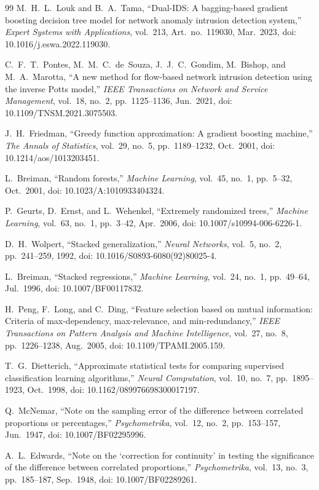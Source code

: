 \documentclass[10pt,journal,twocolumn]{IEEEtran}
\begin{document}
\begin{thebibliography}{99}
M.~H.~L.~Louk and B.~A.~Tama, ``Dual-IDS: A bagging-based gradient boosting decision tree model for network anomaly intrusion detection system,'' \emph{Expert Systems with Applications}, vol.~213, Art.~no.~119030, Mar.~2023, doi: 10.1016/j.eswa.2022.119030.

C.~F.~T.~Pontes, M.~M.~C.~de~Souza, J.~J.~C.~Gondim, M.~Bishop, and M.~A.~Marotta, ``A new method for flow-based network intrusion detection using the inverse Potts model,'' \emph{IEEE Transactions on Network and Service Management}, vol.~18, no.~2, pp.~1125--1136, Jun.~2021, doi: 10.1109/TNSM.2021.3075503.

J.~H.~Friedman, ``Greedy function approximation: A gradient boosting machine,'' \emph{The Annals of Statistics}, vol.~29, no.~5, pp.~1189--1232, Oct.~2001, doi: 10.1214/aos/1013203451.

L.~Breiman, ``Random forests,'' \emph{Machine Learning}, vol.~45, no.~1, pp.~5--32, Oct.~2001, doi: 10.1023/A:1010933404324.

P.~Geurts, D.~Ernst, and L.~Wehenkel, ``Extremely randomized trees,'' \emph{Machine Learning}, vol.~63, no.~1, pp.~3--42, Apr.~2006, doi: 10.1007/s10994-006-6226-1.

D.~H.~Wolpert, ``Stacked generalization,'' \emph{Neural Networks}, vol.~5, no.~2, pp.~241--259, 1992, doi: 10.1016/S0893-6080(92)80025-4.

L.~Breiman, ``Stacked regressions,'' \emph{Machine Learning}, vol.~24, no.~1, pp.~49--64, Jul.~1996, doi: 10.1007/BF00117832.

H.~Peng, F.~Long, and C.~Ding, ``Feature selection based on mutual information: Criteria of max-dependency, max-relevance, and min-redundancy,'' \emph{IEEE Transactions on Pattern Analysis and Machine Intelligence}, vol.~27, no.~8, pp.~1226--1238, Aug.~2005, doi: 10.1109/TPAMI.2005.159.

T.~G.~Dietterich, ``Approximate statistical tests for comparing supervised classification learning algorithms,'' \emph{Neural Computation}, vol.~10, no.~7, pp.~1895--1923, Oct.~1998, doi: 10.1162/089976698300017197.

Q.~McNemar, ``Note on the sampling error of the difference between correlated proportions or percentages,'' \emph{Psychometrika}, vol.~12, no.~2, pp.~153--157, Jun.~1947, doi: 10.1007/BF02295996.

A.~L.~Edwards, ``Note on the `correction for continuity' in testing the significance of the difference between correlated proportions,'' \emph{Psychometrika}, vol.~13, no.~3, pp.~185--187, Sep.~1948, doi: 10.1007/BF02289261.


\end{thebibliography}
\end{document}
